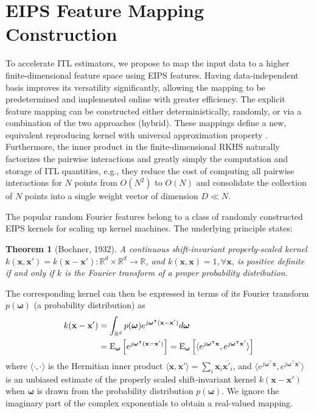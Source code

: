 \documentclass[8pt,twocolumn]{IEEEtran}
\newcommand{\R}{\mathbb{R}}
\newcommand{\x}{\mathbf{x}}
\newtheorem{thm}{Theorem}  \newtheorem{lem}[thm]{Lemma}        \newtheorem{cor}[thm]{Corollary}
\begin{document}
\section{EIPS Feature Mapping Construction}\label{Sec:RKHS}
To accelerate ITL estimators, we propose to map the input data to a higher finite-dimensional feature space using EIPS features. Having data-independent basis improves its versatility significantly, allowing the mapping to be predetermined and implemented online with greater efficiency. The explicit feature mapping can be constructed either deterministically, randomly, or via a combination of the two approaches (hybrid). These mappings define a new, equivalent reproducing kernel with universal approximation property \cite{Li2019notrick}. Furthermore, the inner product in the finite-dimensional RKHS naturally factorizes the pairwise interactions and greatly simply the computation and storage of ITL quantities, e.g., they reduce the cost of computing all pairwise interactions for $N$ points from $O(N^2)$ to $O(N)$ and consolidate the collection of $N$ points into a single weight vector of dimension $D\ll N$. 

The popular random Fourier features \cite{rahimi2007RFF} belong to a class of randomly constructed EIPS kernels for scaling up kernel machines. The underlying principle states:
\begin{thm}[Bochner, 1932\cite{Bochner1959}]
	A continuous shift-invariant properly-scaled kernel $k(\mathbf{x},\mathbf{x}')=k(\mathbf{x}-\mathbf{x}'):\R^d\times\R^d\rightarrow\R$, and $k(\x,\x)=1,\forall\x$, is positive definite if and only if $k$ is the Fourier transform of a proper probability distribution.
\end{thm}
The corresponding kernel can then be expressed in terms of its Fourier transform $p(\bm{\omega})$ (a probability distribution) as
\begin{align}
k(\mathbf{x}-\mathbf{x}')&=\int_{\R^d}p(\bm{\omega})e^{j\bm{\omega}^\intercal(\mathbf{x}-\mathbf{x}')}d\bm{\omega}\label{eq:kintergral}\\
&={\rm E}_{\bm{\omega}}\left[e^{j\bm{\omega}^\intercal(\mathbf{x}-\mathbf{x}')}\right]={\rm E}_{\bm{\omega}}\left[\langle e^{j\bm{\omega}^\intercal\mathbf{x}},e^{j\bm{\omega}^\intercal\mathbf{x}'}\rangle\right]\label{eq:Fourier_kernel}
\end{align}
where $\langle \cdot,\cdot \rangle$ is the Hermitian inner product $\langle \mathbf{x},\mathbf{x}'\rangle =\sum_i\mathbf{x}_i\overline{\mathbf{x}'_i}$, and $\langle e^{j\bm{\omega}^\intercal\mathbf{x}},e^{j\bm{\omega}^\intercal\mathbf{x}'}\rangle$ is an unbiased estimate of the properly scaled shift-invariant kernel $k(\mathbf{x}-\mathbf{x}')$ when $\bm{\omega}$ is drawn from the probability distribution $p(\bm{\omega})$. We ignore the imaginary part of the complex exponentials to obtain a real-valued mapping.
\end{document}
